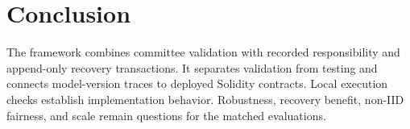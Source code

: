 \section{Conclusion}
The framework combines committee validation with recorded responsibility and
append-only recovery transactions. It separates validation from testing and
connects model-version traces to deployed Solidity contracts. Local execution
checks establish implementation behavior. Robustness, recovery benefit,
non-IID fairness, and scale remain questions for the matched evaluations.
